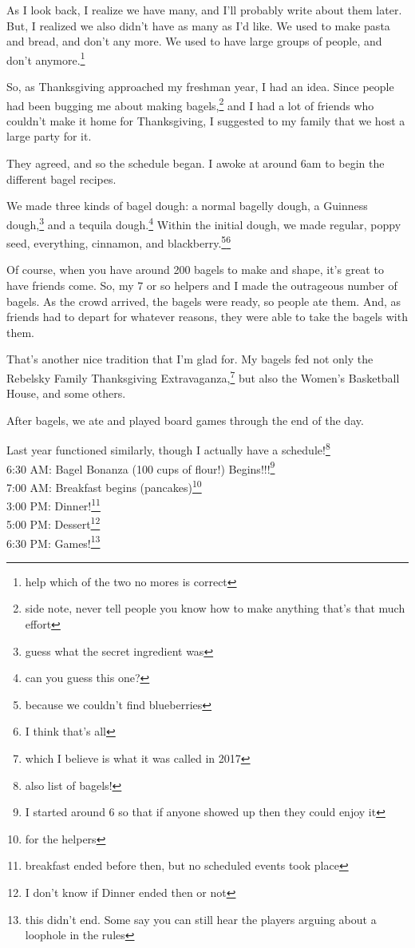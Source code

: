 \documentclass[12pt]{article}[titlepage]
\newcommand{\1}{\={a}}
\newcommand{\2}{\={e}}
\newcommand{\3}{\={\i}}
\newcommand{\4}{\=o}
\newcommand{\5}{\=u}
\newcommand{\6}{\={A}}
\renewcommand{\,}{\textsuperscript{,}}
\begin{document}
As I look back, I realize we have many, and I'll probably write about them later.
But, I realized we also didn't have as many as I'd like.
We used to make pasta and bread, and don't any more.
We used to have large groups of people, and don't anymore.\footnote{help which of the two no mores is correct}

So, as Thanksgiving approached my freshman year, I had an idea.
Since people had been bugging me about making bagels,\footnote{side note, never tell people you know how to make anything that's that much effort} and I had a lot of friends who couldn't make it home for Thanksgiving, I suggested to my family that we host a large party for it.

They agreed, and so the schedule began.
I awoke at around 6am to begin the different bagel recipes.

We made three kinds of bagel dough: a normal bagelly dough, a Guinness dough,\footnote{guess what the secret ingredient was} and a tequila dough.\footnote{can you guess this one?}
Within the initial dough, we made regular, poppy seed, everything, cinnamon, and blackberry.\footnote{because we couldn't find blueberries}\footnote{I think that's all}

Of course, when you have around 200 bagels to make and shape, it's great to have friends come.
So, my 7 or so helpers and I made the outrageous number of bagels.
As the crowd arrived, the bagels were ready, so people ate them.
And, as friends had to depart for whatever reasons, they were able to take the bagels with them.

That's another nice tradition that I'm glad for.
My bagels fed not only the Rebelsky Family Thanksgiving Extravaganza,\footnote{which I believe is what it was called in 2017} but also the Women's Basketball House, and some others.

After bagels, we ate and played board games through the end of the day.

Last year functioned similarly, though I actually have a schedule!\footnote{also list of bagels!}\\
6:30 AM: Bagel Bonanza (100 cups of flour!) Begins!!!\footnote{I started around 6 so that if anyone showed up then they could enjoy it}\\
7:00 AM: Breakfast begins (pancakes)\footnote{for the helpers}\\
3:00 PM: Dinner!\footnote{breakfast ended before then, but no scheduled events took place}\\
5:00 PM: Dessert\footnote{I don't know if Dinner ended then or not}\\
6:30 PM: Games!\footnote{this didn't end. Some say you can still hear the players arguing about a loophole in the rules}
\end{document}
